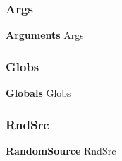 \subsubsection{Args}
{\footnotesize\ttfamily \textbf{ Arguments} Args}

\mbox{\label{common_8h_a2a123bbda4503ceb387f31a384139bec}} 
\subsubsection{Globs}
{\footnotesize\ttfamily \textbf{ Globals} Globs}

\mbox{\label{common_8h_a683edca1300d89e758d2347c2b85369e}} 
\subsubsection{Rnd\+Src}
{\footnotesize\ttfamily \textbf{ Random\+Source} Rnd\+Src}

